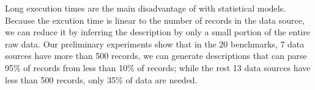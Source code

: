Long execution times are the main disadvantage of \learnpads{} with
statistical models. Because the excution time is linear to the
number of records in the data source, we can reduce it by inferring
the description by only a small portion of the entire raw data. Our
preliminary experiments show that in the 20 benchmarks, 7 data sources
have more than 500 records, we can generate descriptions that can
parse 95\% of records from less than 10\% of records; while the rest
13 data sources have less than 500 records, only 35\% of data are
needed.

